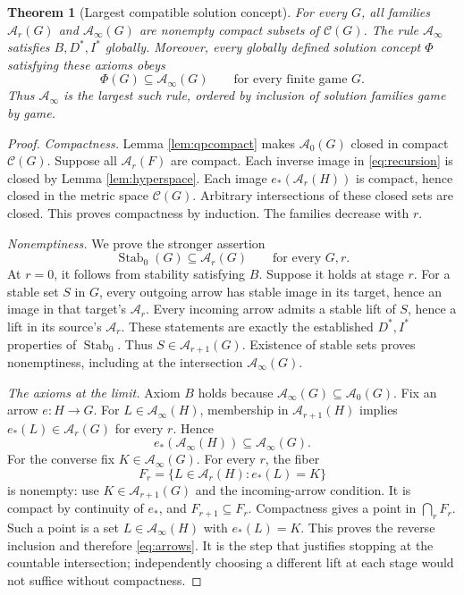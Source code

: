 \documentclass[11pt]{article}
\newtheorem{theorem}{Theorem}
\theoremstyle{definition}
\newcommand{\Stab}{\operatorname{Stab}_0}
\newcommand{\CC}{\mathscr C}
\newcommand{\A}{\mathcal A}
\begin{document}
\begin{theorem}[Largest compatible solution concept]\label{thm:maximal}
For every $G$, all families $\A_r(G)$ and $\A_\infty(G)$ are nonempty compact
subsets of $\CC(G)$. The rule $\A_\infty$ satisfies $B,D^*,I^*$ globally.
Moreover, every globally defined solution concept $\Phi$ satisfying these
axioms obeys
\begin{equation}\label{eq:largest}
 \Phi(G)\subseteq\A_\infty(G)\qquad\text{for every finite game }G.
\end{equation}
Thus $\A_\infty$ is the largest such rule, ordered by inclusion of solution
families game by game.
\end{theorem}
\begin{proof}
\emph{Compactness.} Lemma \ref{lem:qpcompact} makes $\A_0(G)$ closed in compact
$\CC(G)$. Suppose all $\A_r(F)$ are compact. Each inverse image in
\eqref{eq:recursion} is closed by Lemma \ref{lem:hyperspace}. Each image
$e_*(\A_r(H))$ is compact, hence closed in the metric space $\CC(G)$.
Arbitrary intersections of these closed sets are closed. This proves
compactness by induction. The families decrease with $r$.

\emph{Nonemptiness.} We prove the stronger assertion
\begin{equation}\label{eq:stableprotected}
 \Stab(G)\subseteq\A_r(G)\qquad\text{for every }G,r.
\end{equation}
At $r=0$, it follows from stability satisfying $B$. Suppose it holds at stage
$r$. For a stable set $S$ in $G$, every outgoing arrow has stable image in its
target, hence an image in that target's $\A_r$. Every incoming arrow admits a
stable lift of $S$, hence a lift in its source's $\A_r$. These statements are
exactly the established $D^*,I^*$ properties of $\Stab$.
Thus $S\in\A_{r+1}(G)$. Existence of stable sets proves nonemptiness, including
at the intersection $\A_\infty(G)$.

\emph{The axioms at the limit.} Axiom $B$ holds because
$\A_\infty(G)\subseteq\A_0(G)$. Fix an arrow $e:H\to G$. For
$L\in\A_\infty(H)$, membership in $\A_{r+1}(H)$ implies
$e_*(L)\in\A_r(G)$ for every $r$. Hence
\[
 e_*(\A_\infty(H))\subseteq\A_\infty(G).
\]
For the converse fix $K\in\A_\infty(G)$. For every $r$, the fiber
\[
 F_r=\{L\in\A_r(H):e_*(L)=K\}
\]
is nonempty: use $K\in\A_{r+1}(G)$ and the incoming-arrow condition.
It is compact by continuity of $e_*$, and $F_{r+1}\subseteq F_r$.
Compactness gives a point in $\bigcap_rF_r$. Such a point is a set
$L\in\A_\infty(H)$ with $e_*(L)=K$. This proves the reverse inclusion and
therefore \eqref{eq:arrows}. It is the step that justifies stopping at the
countable intersection; independently choosing a different lift at each
stage would not suffice without compactness.


\end{proof}
\end{document}

